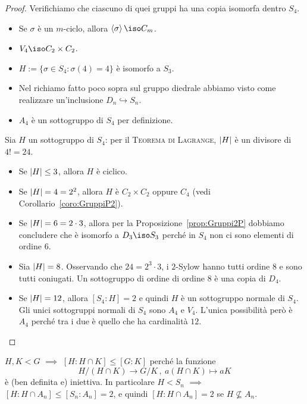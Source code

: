 \begin{proof}
Verifichiamo che ciascuno di quei gruppi ha una copia isomorfa dentro $S_4$. 
\begin{itemize}
\item Se $\sigma$ è un $m$-ciclo, allora $\gen\sigma \iso C_m$.
\item $V_4 \iso C_2 \times C_2$.
\item $H := \{\sigma \in S_4 : \sigma(4)=4\}$ è isomorfo a $S_3$.
\item Nel richiamo fatto poco sopra sul gruppo diedrale abbiamo visto come realizzare un'inclusione $D_n \hookrightarrow S_n$.
\item $A_4$ è un sottogruppo di $S_4$ per definizione.
\end{itemize}
Sia $H$ un sottogruppo di $S_4$: per il {\scshape Teorema di Lagrange}, $\left\lvert H\right\rvert$ è un divisore di $4! = 24$.
\begin{itemize}
\item Se $\left\lvert H\right\rvert \le 3$, allora $H$ è ciclico.
\item Se $\left\lvert H\right\rvert = 4 = 2^2$, allora $H$ è $C_2 \times C_2$ oppure $C_4$ (vedi Corollario~\ref{coro:GruppiP2}).
\item Se $\left\lvert H\right\rvert = 6 = 2 \cdot 3$, allora per la Proposizione~\ref{prop:Gruppi2P} dobbiamo concludere che è isomorfo a $D_3 \iso S_3$ perché in $S_4$ non ci sono elementi di ordine $6$.
\item Sia $\left\lvert H\right\rvert=8$. Osservando che $24 = 2^3 \cdot 3$, i $2$-Sylow hanno tutti ordine $8$ e sono tutti coniugati. Un sottogruppo di ordine di ordine $8$ è una copia di $D_4$.
\item Se $\left\lvert H\right\rvert=12$, allora $[S_4:H] = 2$ e quindi $H$ è un sottogruppo normale di $S_4$. Gli unici sottogruppi normali di $S_4$ sono $A_4$ e $V_4$. L'unica possibilità però è $A_4$ perché tra i due è quello che ha cardinalità $12$. \qedhere
\end{itemize}
\end{proof}



\begin{osse}
$H,K<G$ $\implies$ $[H:H\cap K]\le[G:K]$ perché la funzione
\[
H/(H\cap K)\to G/K \,,\ a(H\cap K)\mapsto aK
\]
è (ben definita e) iniettiva. In particolare $H<S_n$ $\implies$ $[H:H\cap A_n]\le[S_n:A_n]=2$, e quindi $[H:H\cap A_n]=2$ se $H\nsubseteq A_n$.
\end{osse}


